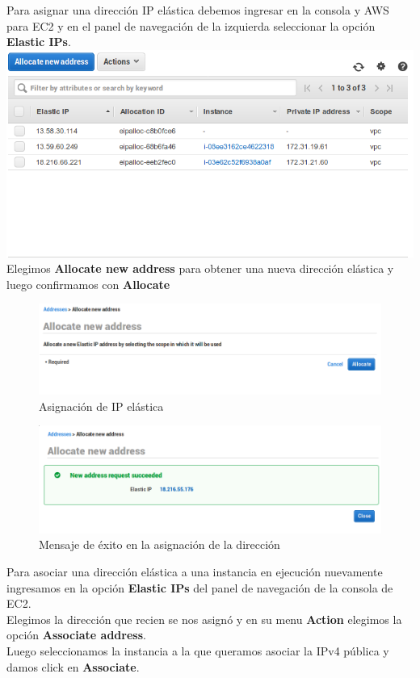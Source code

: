 \documentclass[9pt]{article}
\begin{document}
Para asignar una dirección IP elástica debemos ingresar en la consola y \textsc{AWS} para \textsf{EC2} y en el panel de navegación de la izquierda seleccionar la opción \textbf{Elastic IPs}.\\
\includegraphics[width=\textwidth]{elastic_ip}
\\
Elegimos \textbf{Allocate new address} para obtener una nueva dirección elástica y luego confirmamos con \textbf{Allocate}
\begin{figure}[H]
  \centering
  \includegraphics[width=\textwidth]{elastic_ip_allocate}
  \caption{Asignación de IP elástica}
\end{figure}

\begin{figure}[H]
  \centering
  \includegraphics[width=\textwidth]{elastic_ip_success}
  \caption{Mensaje de éxito en la asignación de la dirección}
\end{figure}

Para asociar una dirección elástica a una instancia en ejecución nuevamente ingresamos en la opción \textbf{Elastic IPs} del panel de navegación de la consola de \textsf{EC2}. \\
Elegimos la dirección que recien se nos asignó y en su menu \textbf{Action} elegimos la opción \textbf{Associate address}. \\
Luego seleccionamos la instancia a la que queramos asociar la IPv4 pública y damos click en \textbf{Associate}.
\end{document}
